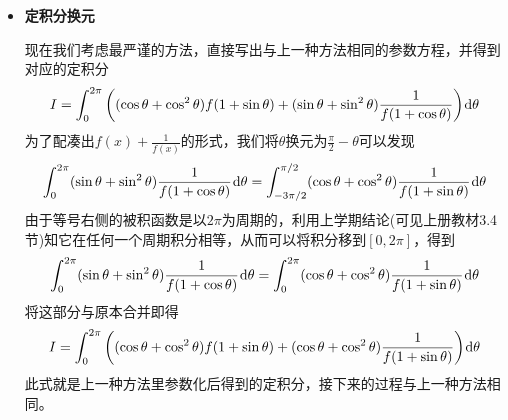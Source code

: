 \documentclass[a4paper,UTF8,fontset=windows,AutoFakeBold]{ctexart}
\newcommand*{\dr}{\hspace{0.07em}\mathrm{d}}
\newcommand*{\note}{\noindent *}
\theoremstyle{ex}
\newcommand{\exref}[1]{\textbf{题\;\ref{#1}\;}}
\begin{document}
\begin{framed}
{\begin{itemize}
        \note 严谨证明可以通过极坐标参数化后写出两边并进行定积分换元进行。

        利用此结论可直接得到
        $$\oint_{L^+}-\frac{y}{f(x)}\dr x=\oint_{L^+}\frac{x}{f(y)}\dr y$$
        由此
        $$I=\oint_{L^+}x\bigg(f(y)+\frac{1}{f(y)}\bigg)\dr y$$

        \note 注意即使曲线上$x\ge0$，此时也无法直接把$f(y)+\frac{1}{f(y)}$放缩为2，第二型曲线积分\textbf{并不具有被积函数越大积分越大的性质}。

        为了进行估算，我们仍需要写出定积分。利用非原点中心极坐标可以得到圆的参数方程
        $$\begin{cases}x=1+\cos\theta\\y=1+\sin\theta\end{cases}(0\le\theta\le2\pi)$$
        极坐标已经为逆时针定向，无需结果添加负号。直接计算有
        $$x_\theta=-\sin\theta,\quad y_\theta=\cos\theta$$    
        代入$\dr x=x_\theta\dr\theta$、$\dr y=y_\theta\dr\theta$与$x$、$y$的参数方程可得
        $$I=\int_0^{2\pi}(\cos\theta+\cos^2\theta)\bigg(f(1+\sin\theta)+\frac{1}{f(1+\sin\theta)}\bigg)\dr\theta$$
        注意到这步仍然无法直接放缩，因为$\cos\theta+\cos^2\theta$的符号无法保证。不过，\textbf{仔细观察}可以发现实际上有(由于$\sin0=\sin(2\pi)$，换元$t=\sin\theta$后是0到0积分，因此为0)
        $$\int_0^{2\pi}\cos\theta\bigg(f(1+\sin\theta)+\frac{1}{f(1+\sin\theta)}\bigg)\dr\theta=\int_0^{2\pi}\bigg(f(1+\sin\theta)+\frac{1}{f(1+\sin\theta)}\bigg)\dr\sin\theta=0$$

        \note 也可根据\textbf{对称性}分析，将$\theta$换元为$\pi-\theta$后考虑相互抵消的部分得到相同的结论。

        去除这一部分后，我们得到了
        $$I=\int_0^{2\pi}\cos^2\theta\bigg(f(1+\sin\theta)+\frac{1}{f(1+\sin\theta)}\bigg)\dr\theta$$
        此时被积函数非负，终于可以放缩出(计算与\exref{sin 2 and 4 to 2pi}完全类似)
        $$I\ge\int_0^{2\pi}2\cos^2\theta\dr\theta=2\pi$$

        \item \textbf{定积分换元}
        
        现在我们考虑最严谨的方法，直接写出与上一种方法相同的参数方程，并得到对应的定积分
        $$I=\int_0^{2\pi}\bigg((\cos\theta+\cos^2\theta)f(1+\sin\theta)+(\sin\theta+\sin^2\theta)\frac{1}{f(1+\cos\theta)}\bigg)\dr\theta$$
        为了配凑出$f(x)+\frac{1}{f(x)}$的形式，我们将$\theta$换元为$\frac{\pi}{2}-\theta$可以发现
        $$\int_0^{2\pi}(\sin\theta+\sin^2\theta)\frac{1}{f(1+\cos\theta)}\dr\theta=\int_{-3\pi/2}^{\pi/2}(\cos\theta+\cos^2\theta)\frac{1}{f(1+\sin\theta)}\dr\theta$$
        由于等号右侧的被积函数是以$2\pi$为周期的，利用上学期结论(可见上册教材3.4节)知它在任何一个周期积分相等，从而可以将积分移到$[0,2\pi]$，得到
        $$\int_0^{2\pi}(\sin\theta+\sin^2\theta)\frac{1}{f(1+\cos\theta)}\dr\theta=\int_0^{2\pi}(\cos\theta+\cos^2\theta)\frac{1}{f(1+\sin\theta)}\dr\theta$$
        将这部分与原本合并即得
        $$I=\int_0^{2\pi}\bigg((\cos\theta+\cos^2\theta)f(1+\sin\theta)+(\cos\theta+\cos^2\theta)\frac{1}{f(1+\sin\theta)}\bigg)\dr\theta$$
        此式就是上一种方法里参数化后得到的定积分，接下来的过程与上一种方法相同。
    \end{itemize}

}
\end{framed}
\end{document}
